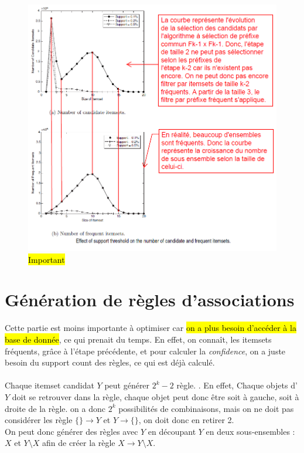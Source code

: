 \documentclass[letterpaper, 12pt]{article}
\newcommand{\alinea}{
\hspace*{0.5cm}}
\newcommand{\myul}[1]{
		\underline{\smash{#1}}
	}
\begin{document}
			\begin{figure}[H]
				\centering
				\includegraphics[scale=0.75]{Images/support_treshold}
				\caption{\hl{Important}}
				\label{fig:support_threshold}
			\end{figure}\noindent
	\newpage
	\section{Génération de règles d'associations}
		\alinea Cette partie est moins importante à optimiser car \hl{on
			a plus besoin d'accéder à la base de donnée}, ce qui prenait
			du temps. En effet, on connaît, les itemsets fréquents, grâce 
			à l'étape précédente, et pour calculer la \textit{confidence},
			on a juste besoin du support count des règles, ce qui est 
			déjà calculé.\\
		~\\
		\alinea Chaque itemset candidat $Y$ peut générer $2^k - 2$ 
			règle. \myul{\textbf{\hl{On peut le prouver}}}. En effet,
			Chaque objets d'$Y$ doit se retrouver dans la règle, chaque
			objet peut donc être soit à gauche, soit à droite de la règle.
			on a donc $2^k$ possibilités de combinaisons, mais on ne 
			doit pas considérer les règle $\{\} 
			\longrightarrow Y$ et $Y \longrightarrow \{\}$, on doit
			donc en retirer 2.\\
		\alinea On peut donc générer des règles avec $Y$ en découpant 
			$Y$ en deux sous-ensembles : $X$ et $Y\setminus X$ afin de
			créer la règle $X \longrightarrow Y \setminus X$.
\end{document}
